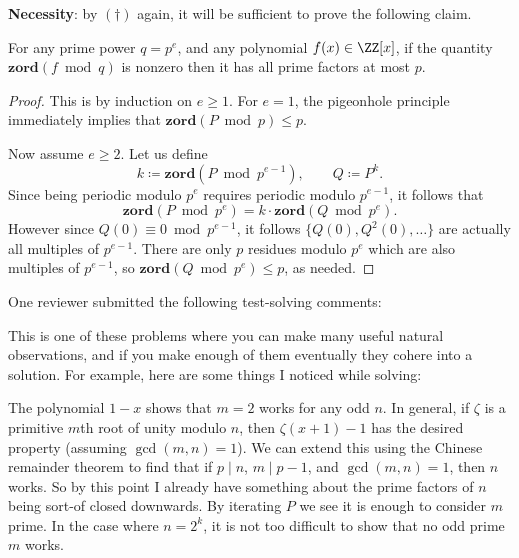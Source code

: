 \textbf{Necessity}: by $(\dagger)$ again,
it will be sufficient to prove the following claim.
\begin{claim*}
  For any prime power $q = p^e$, and any polynomial $f(x) \in \ZZ[x]$,
  if the quantity $\mathbf{zord}(f \bmod q)$ is nonzero
  then it has all prime factors at most $p$.
\end{claim*}
\begin{proof}
  This is by induction on $e \ge 1$.
  For $e=1$, the pigeonhole principle immediately
  implies that $\mathbf{zord}(P \bmod p) \le p$.

  Now assume $e \ge 2$.
  Let us define
  \[ k \coloneqq \mathbf{zord}(P \bmod{p^{e-1}}),
    \qquad Q \coloneqq P^k. \]
  Since being periodic modulo $p^e$ requires periodic modulo $p^{e-1}$,
  it follows that
  \[ \mathbf{zord}(P \bmod{p^e}) = k \cdot \mathbf{zord}(Q \bmod{p^e}). \]
  However since $Q(0) \equiv 0\bmod p^{e-1}$, it follows $\{Q(0), Q^2(0), \dots\}$
  are actually all multiples of $p^{e-1}$.
  There are only $p$ residues modulo $p^e$ which are also multiples of $p^{e-1}$,
  so $\mathbf{zord}(Q \bmod{p^e}) \le p$, as needed.
\end{proof}

\begin{remark*}
  One reviewer submitted the following test-solving comments:

  This is one of these problems where you can make many useful natural observations,
  and if you make enough of them eventually they cohere into a solution.
  For example, here are some things I noticed while solving:
  \begin{itemize}
  \ii The polynomial $1-x$ shows that $m=2$ works for any odd $n$.
  \ii In general, if $\zeta$ is a primitive $m$th root of unity
  modulo $n$, then $\zeta(x+1)-1$ has the desired property (assuming $\gcd(m,n) = 1$).
  We can extend this using the Chinese remainder theorem
  to find that if $p \mid n$, $m \mid p-1$, and $\gcd(m,n)=1$, then $n$ works.
  So by this point I already have something
  about the prime factors of $n$ being sort-of closed downwards.
  \ii By iterating $P$ we see it is enough to consider $m$ prime.
  \ii In the case where $n=2^k$,
  it is not too difficult to show that no odd prime $m$ works.
  \end{itemize}
\end{remark*}
